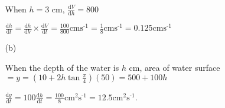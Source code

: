 \begin{enumerate}
\begin{enumerate}
When $h=3$ cm, $\frac{\text{d}V}{\text{d}h}=800$

$\frac{\text{d}h}{\text{d}t}=\frac{\text{d}h}{\text{d}V}\times\frac{\text{d}V}{\text{d}t}=\frac{100}{800}\text{cm}\text{s}^{\text{-1}}=\frac{1}{8}\text{cm}\text{s}^{\text{-1}}=0.125\text{cm}\text{s}^{\text{-1}}$
\item[(b)] 

When the depth of the water is $h$ cm, area of water surface $=y=(10+2h\tan\frac{\pi}{4})(50)=500+100h$ 

$\frac{\text{d}y}{\text{d}t}=100\frac{\text{d}h}{\text{d}t}=\frac{100}{8}\text{cm}^{2}\text{s}^{\text{-1}}=12.5\text{cm}^{2}\text{s}^{\text{-1}}$.
\end{enumerate}
\end{enumerate}